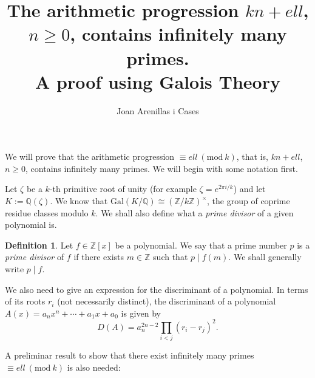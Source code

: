 \documentclass[a4paper, 12pt]{article}
\title{\textbf{The arithmetic progression ${k}n+{ell}$, $n\geqslant0$, contains infinitely many primes.\\ A proof using Galois Theory}}
\author[1]{Joan Arenillas i Cases}
\theoremstyle{definition}
\newtheorem{definition}[theorem]{Definition}
\theoremstyle{remark}
\newcommand{\Z}{\ensuremath{\mathbb{Z}}}
\newcommand{\Q}{\ensuremath{\mathbb{Q}}}
\newcommand{\Mod}[1]{\ (\mathrm{mod}\ #1)} %
\begin{document}
\maketitle
\sloppy
We will prove that the arithmetic progression $\equiv {ell} \Mod{{k}}$, that is, ${k}n+{ell}$, $n\geqslant0$, contains infinitely many primes. We will begin with some notation first.

Let $\zeta$ be a ${k}$-th primitive root of unity (for example $\zeta=e^{2\pi i/{{k}}}$) and let $K:=\Q(\zeta)$. We know that $\text{Gal}(K/\Q)\cong (\Z/{k}\Z)^\times$, the group of coprime residue classes modulo ${k}$. We shall also define what a \emph{prime divisor} of a given polynomial is. 
\begin{definition}
Let $f\in\Z[x]$ be a polynomial. We say that a prime number $p$ is a \emph{prime divisor} of $f$ if there exists $m\in\Z$ such that $p\mid f(m)$. We shall generally write $p\mid f$.
\end{definition}

We also need to give an expression for the discriminant of a polynomial. In terms of its roots $r_i$ (not necessarily distinct), the discriminant of a polynomial $A(x)=a_nx^n+\cdots+a_1x+a_0$ is given by
	\begin{equation}\label{discrim}
		D(A)=a_n^{2n-2}\prod_{i<j}(r_i-r_j)^2.
	\end{equation}

A preliminar result to show that there exist infinitely many primes $\equiv {ell}\Mod{{k}}$ is also needed:
\end{document}
